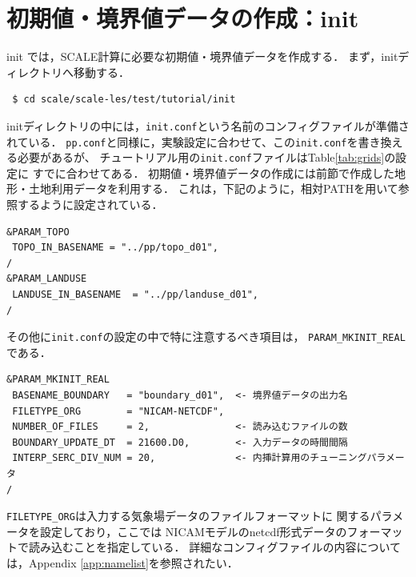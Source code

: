 \section{初期値・境界値データの作成：init}

init では，SCALE計算に必要な初期値・境界値データを作成する．
まず，initディレクトリへ移動する．
\begin{verbatim}
 $ cd scale/scale-les/test/tutorial/init
\end{verbatim}

initディレクトリの中には，\verb|init.conf|という名前のコンフィグファイルが準備されている．
\verb|pp.conf|と同様に，実験設定に合わせて、この\verb|init.conf|を書き換える必要があるが、
チュートリアル用の\verb|init.conf|ファイルはTable\ref{tab:grids}の設定に
すでに合わせてある．
初期値・境界値データの作成には前節で作成した地形・土地利用データを利用する．
これは，下記のように，相対PATHを用いて参照するように設定されている．

\begin{verbatim}
&PARAM_TOPO
 TOPO_IN_BASENAME = "../pp/topo_d01",
/
&PARAM_LANDUSE
 LANDUSE_IN_BASENAME  = "../pp/landuse_d01",
/
\end{verbatim}
その他に\verb|init.conf|の設定の中で特に注意するべき項目は，
\verb|PARAM_MKINIT_REAL|である．

\begin{verbatim}
&PARAM_MKINIT_REAL
 BASENAME_BOUNDARY   = "boundary_d01",  <- 境界値データの出力名
 FILETYPE_ORG        = "NICAM-NETCDF",
 NUMBER_OF_FILES     = 2,               <- 読み込むファイルの数
 BOUNDARY_UPDATE_DT  = 21600.D0,        <- 入力データの時間間隔
 INTERP_SERC_DIV_NUM = 20,              <- 内挿計算用のチューニングパラメータ
/
\end{verbatim}

\verb|FILETYPE_ORG|は入力する気象場データのファイルフォーマットに
関するパラメータを設定しており，ここでは
NICAMモデルのnetcdf形式データのフォーマットで読み込むことを指定している．
詳細なコンフィグファイルの内容については，Appendix \ref{app:namelist}を参照されたい．

